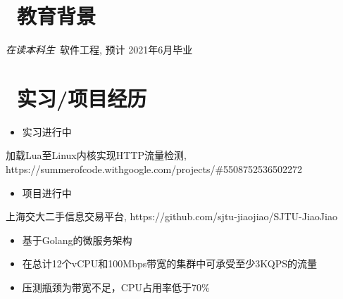 \documentclass{resume}
\begin{document}



\section{\faGraduationCap\  教育背景}
\textit{在读本科生}\ 软件工程, 预计 2021年6月毕业

\section{\faUsers\ 实习/项目经历}
\role{研发支撑组}{实习生}
\begin{onehalfspacing}
    \begin{itemize}
        \item 实习进行中
    \end{itemize}
\end{onehalfspacing}

\begin{onehalfspacing}
    加载Lua至Linux内核实现HTTP流量检测, https://summerofcode.withgoogle.com/projects/\#5508752536502272
    \begin{itemize}
        \item 项目进行中
    \end{itemize}
\end{onehalfspacing}

\begin{onehalfspacing}
    上海交大二手信息交易平台, https://github.com/sjtu-jiaojiao/SJTU-JiaoJiao
    \begin{itemize}
        \item 基于Golang的微服务架构
        \item 在总计12个vCPU和100Mbps带宽的集群中可承受至少3KQPS的流量
        \item 压测瓶颈为带宽不足，CPU占用率低于70\%
    \end{itemize}
\end{onehalfspacing}
\end{document}
